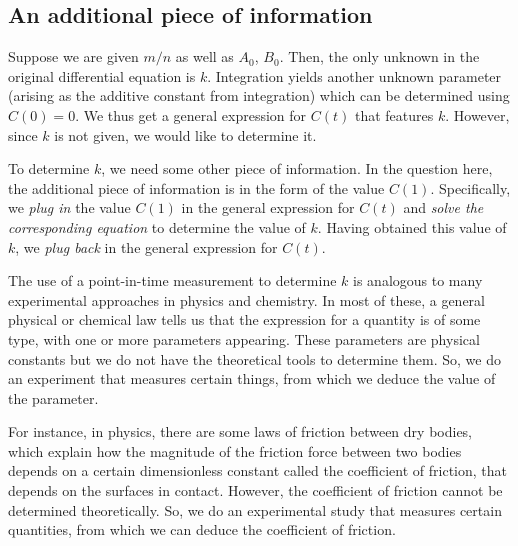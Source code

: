 \documentclass[10pt]{amsart}
\begin{document}
\subsection{An additional piece of information}

Suppose we are given $m/n$ as well as $A_0$, $B_0$. Then, the only
unknown in the original differential equation is $k$. Integration
yields another unknown parameter (arising as the additive constant
from integration) which can be determined using $C(0) = 0$. We thus
get a general expression for $C(t)$ that features $k$. However, since
$k$ is not given, we would like to determine it.

To determine $k$, we need some other piece of information. In the
question here, the additional piece of information is in the form of
the value $C(1)$. Specifically, we {\em plug in} the value $C(1)$ in
the general expression for $C(t)$ and {\em solve the corresponding
equation} to determine the value of $k$. Having obtained this value of
$k$, we {\em plug back} in the general expression for $C(t)$.

The use of a point-in-time measurement to determine $k$ is analogous
to many experimental approaches in physics and chemistry. In most of
these, a general physical or chemical law tells us that the expression
for a quantity is of some type, with one or more parameters
appearing. These parameters are physical constants but we do not have
the theoretical tools to determine them. So, we do an experiment that
measures certain things, from which we deduce the value of the parameter.

For instance, in physics, there are some laws of friction between dry
bodies, which explain how the magnitude of the friction force between
two bodies depends on a certain dimensionless constant called the
coefficient of friction, that depends on the surfaces in
contact. However, the coefficient of friction cannot be determined
theoretically. So, we do an experimental study that measures certain
quantities, from which we can deduce the coefficient of friction.
\end{document}
